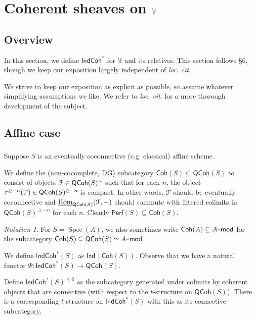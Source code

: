 \documentclass[reqno,11pt]{amsart}
\numberwithin{equation}{subsection}
\theoremstyle{remark}
\newtheorem{notation}[thm]{Notation}
\newcommand{\sF}{{\EuScript F}}
\newcommand{\sY}{{\EuScript Y}}
\newcommand{\on}{\operatorname}
\newcommand{\ul}{\underline}
\newcommand{\mathendash}{\text{\textendash}}
\newcommand{\Hom}{\on{Hom}}
\newcommand{\Spec}{\on{Spec}}
\renewcommand{\mod}{\mathendash\mathsf{mod}}
\newcommand{\Ind}{\mathsf{Ind}}
\newcommand{\Perf}{\mathsf{Perf}}
\newcommand{\Coh}{\mathsf{Coh}}
\newcommand{\IndCoh}{\mathsf{IndCoh}}
\newcommand{\QCoh}{\mathsf{QCoh}}
\renewcommand{\subset}{\subseteq}
\begin{document}
\section{Coherent sheaves on $\sY$}\label{s:indcoh}

\subsection{Overview}

In this section, we define $\IndCoh^*$ for $\sY$ and its relatives.
This section follows \cite{methods} \S 6, though we keep our exposition largely
independent of \emph{loc. cit}. 

We strive to keep our exposition as explicit as possible, so assume
whatever simplifying assumptions we like. We refer to \emph{loc. cit}. for
a more thorough development of the subject.

\subsection{Affine case}

\subsubsection{}

Suppose $S$ is an eventually coconnective (e.g. classical) affine scheme.

We define the (non-cocomplete, DG) subcategory $\Coh(S) \subset \QCoh(S)$
to consist of objects $\sF \in \QCoh(S)^+$ such that for each $n$, the object
$\tau^{\geq -n}(\sF) \in \QCoh(S)^{\geq -n}$ is compact. 
In other words, $\sF$ should be eventually coconnective and 
$\ul{\Hom}_{\QCoh(S)}(\sF,-)$ should commute with
filtered colimits in $\QCoh(S)^{\geq -n}$ for each $n$.
Clearly $\Perf(S) \subset \Coh(S)$.

\begin{notation}

For $S = \Spec(A)$, we also sometimes write $\Coh(A) \subset A\mod$ for 
the subcategory $\Coh(S) \subset \QCoh(S) \simeq A\mod$.

\end{notation}

We define $\IndCoh^*(S)$ as $\Ind(\Coh(S))$. 
Observe that we have a
natural functor $\Psi:\IndCoh^*(S) \to \QCoh(S)$.

Define $\IndCoh^*(S)^{\leq 0}$ as the subcategory generated
under colimits by coherent objects that are connective (with respect to the
$t$-structure on $\QCoh(S)$). There is a corresponding 
$t$-structure on $\IndCoh^*(S)$ with this as its connective subcategory.
\end{document}
